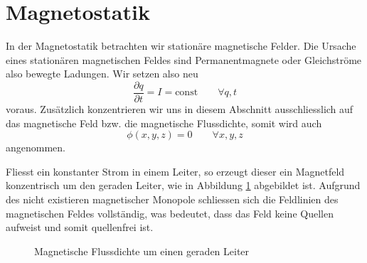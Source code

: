 %
%
%
%
\section{Magnetostatik\label{maxwell:magnetostatik}}



In der Magnetostatik betrachten wir stationäre magnetische Felder.
Die Ursache eines stationären magnetischen Feldes sind Permanentmagnete oder Gleichströme also bewegte Ladungen.
Wir setzen also neu
\[ 
\frac{\partial q}{\partial t}
=
I
=
\text{const}
\qquad
\forall
q,t
\]
voraus.
Zusätzlich konzentrieren wir uns in diesem Abschnitt ausschliesslich auf das magnetische Feld bzw. die magnetische Flussdichte, somit wird auch 
\[\phi(x,y,z) = 0 \qquad \forall x,y,z\] 
angenommen.

Fliesst ein konstanter Strom in einem Leiter, so erzeugt dieser ein Magnetfeld konzentrisch um den geraden Leiter, wie in Abbildung \ref{maxwell:flussdichte} abgebildet ist.
Aufgrund des nicht existieren magnetischer Monopole schliessen sich die Feldlinien des magnetischen Feldes vollständig, was bedeutet, dass das Feld keine Quellen aufweist und somit quellenfrei ist.

\begin{figure}
\centering
	\caption{Magnetische Flussdichte um einen geraden Leiter}
	\label{maxwell:flussdichte}
\end{figure}




